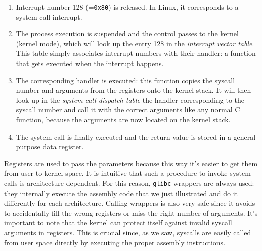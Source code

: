 \begin{enumerate}
    \item Interrupt number 128 (=\verb|0x80|) is released. In Linux, it corresponds to a system call interrupt. 
    \item The process execution is suspended and the control passes to the kernel (kernel mode), which will look up the entry 128 in the \textit{interrupt vector table}. This table simply associates interrupt numbers with their handler: a function that gets executed when the interrupt happens.
    \item The corresponding handler is executed: this function copies the syscall number and arguments from the registers onto the kernel stack. It will then look up in the \textit{system call dispatch table} the handler corresponding to the syscall number and call it with the correct arguments like any normal C function, because the arguments are now located on the kernel stack.
    \item The system call is finally executed and the return value is stored in a general-purpose data register.
\end{enumerate}
Registers are used to pass the parameters because this way it's easier to get them from user to kernel space. It is intuitive that such a procedure to invoke system calls is architecture dependent. For this reason, \verb|glibc| wrappers are always used: they internally execute the assembly code that we just illustrated and do it differently for each architecture.
Calling wrappers is also very safe since it avoids to accidentally fill the wrong registers or miss the right number of arguments.
It's important to note that the kernel can protect itself against invalid syscall arguments in registers. This is crucial since, as we saw, syscalls are easily called from user space directly by executing the proper assembly instructions.

